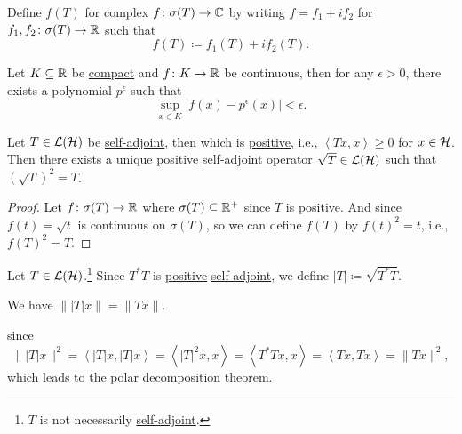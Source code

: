 \begin{note}
	Define \(f(T)\) for complex \(f\colon \sigma (T) \to  \mathbb{\MakeUppercase{c}} \) by writing \(f = f_1 + if_2\) for \(f_1, f_2 \colon \sigma (T) \to \mathbb{\MakeUppercase{r}} \) such that
	\[
		f(T) \coloneqq f_1(T) + if_2(T).
	\]
\end{note}

\begin{theorem}\label{thm:Weierstrass-approximation}
	Let \(K \subseteq \mathbb{\MakeUppercase{r}} \) be \hyperref[def:compact]{compact} and \(f\colon K \to \mathbb{\MakeUppercase{r}} \) be continuous, then for any \(\epsilon > 0\), there exists a polynomial \(p^{\epsilon } \) such that
	\[
		\sup_{x\in K} \vert f(x) - p^{\epsilon }(x)  \vert < \epsilon .
	\]
\end{theorem}

\begin{proposition}
	Let \(T\in \mathcal{\MakeUppercase{l}} (\mathcal{\MakeUppercase{h}} )\) be \hyperref[def:self-adjoint-op]{self-adjoint}, then which is \hyperref[def:positive-op]{positive}, i.e., \(\left\langle Tx, x \right\rangle \geq 0\) for \(x\in \mathcal{\MakeUppercase{h}} \). Then there exists a unique \hyperref[def:positive-op]{positive} \hyperref[def:self-adjoint-op]{self-adjoint operator} \(\sqrt{T} \in \mathcal{\MakeUppercase{l}} (\mathcal{\MakeUppercase{h}} )\) such that \((\sqrt{T} )^{2} = T\).
\end{proposition}
\begin{proof}
	Let \(f\colon \sigma(T) \to \mathbb{\MakeUppercase{r}} \) where \(\sigma (T) \subseteq \mathbb{\MakeUppercase{r}} ^+\) since \(T\) is \hyperref[def:positive-op]{positive}. And since \(f(t) = \sqrt{t} \) is continuous on \(\sigma (T)\), so we can define \(f(T)\) by \(f(t)^2 = t\), i.e., \(f(T)^2 = T\).
\end{proof}

\begin{definition}
	Let \(T\in \mathcal{\MakeUppercase{l}} (\mathcal{\MakeUppercase{h}} )\).\footnote{\(T\) is not necessarily \hyperref[def:self-adjoint-op]{self-adjoint}.} Since \(T^{\ast} T\) is \hyperref[def:positive-op]{positive} \hyperref[def:self-adjoint-op]{self-adjoint}, we define \(\vert T \vert \coloneqq \sqrt{T^{\ast} T} \).
\end{definition}

\begin{note}
	We have \(\lVert \vert T \vert x \rVert = \lVert Tx \rVert \).
\end{note}
\begin{explanation}
	since
	\[
		\lVert \vert T \vert x \rVert ^2
		= \left\langle \vert T \vert x, \vert T \vert x \right\rangle
		= \left\langle \vert T \vert ^2 x, x \right\rangle
		= \left\langle T^{\ast} Tx, x \right\rangle
		= \left\langle Tx, Tx \right\rangle
		= \lVert Tx \rVert ^2,
	\]
	which leads to the polar decomposition theorem.
\end{explanation}

